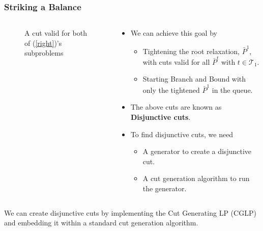 \documentclass{beamer}
\begin{document}
	\begin{frame}[t]
		\frametitle{Striking a Balance}
		\small
		\begin{columns}[T]
			\begin{column}{0.4\textwidth}
				\vspace{-.25cm}
				\begin{figure}[h]
					\caption{A cut valid for both of (\ref{right})'s subproblems}
					\label{p:hull}
				\end{figure}
			\end{column}
			\begin{column}{0.6\textwidth}
				\begin{itemize}
					\item We can achieve this goal by
					\begin{itemize}
						\item Tightening the root relaxation, $ \bar{P}^1 $, with cuts valid for all $ \bar{P}^t $ with $ t \in \mathcal{T}_1 $.
						\item Starting Branch and Bound with only the tightened $ \bar{P}^1 $ in the queue.
					\end{itemize}
					\item The above cuts are known as \textbf{Disjunctive cuts}.
					\item To find disjunctive cuts, we need
					\begin{itemize}
						\item A generator to create a disjunctive cut.
						\item A cut generation algorithm to run the generator.
					\end{itemize}
				\end{itemize}
			\end{column}
		\end{columns}
		\begin{block}{}
			We can create disjunctive cuts by implementing the Cut Generating LP (CGLP) and embedding it within a standard cut generation algorithm.
		\end{block}
		\normalsize
	\end{frame}
\end{document}
